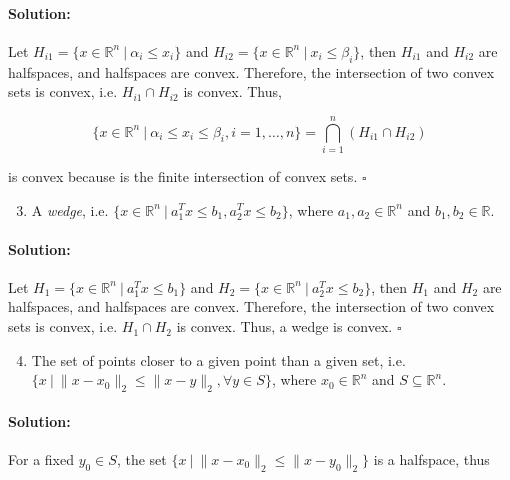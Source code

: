 \documentclass[10pt]{article}
\begin{document}
\paragraph{Solution:}

Let $H_{i1} = \{x \in \mathbb{R}^n \ | \ \alpha_i \leq x_i \}$ and $H_{i2} = \{x \in \mathbb{R}^n \ | \ x_i \leq \beta_i\}$, then $H_{i1}$ and $H_{i2}$ are halfspaces, and halfspaces are convex. Therefore, the intersection of two convex sets is convex, i.e. $H_{i1} \cap H_{i2}$ is convex. Thus, 

$$\{x \in \mathbb{R}^n \ | \ \alpha_i \leq x_i \leq \beta_i, i = 1, \dots, n\} = \bigcap_{i=1}^n \left(H_{i1} \cap H_{i2}\right)$$ 

is convex because is the finite intersection of convex sets. $\square$


\begin{enumerate}[label=(\alph*)]
  \setcounter{enumi}{2}
  \item A \textit{wedge}, i.e. $\{ x \in \mathbb{R}^n \ | \ a_1^Tx \leq b_1, a_2^Tx \leq b_2\}$, where $a_1, a_2 \in \mathbb{R}^n$ and $b_1, b_2 \in \mathbb{R}$.
\end{enumerate}

\paragraph{Solution:}

Let $H_1 = \{ x \in \mathbb{R}^n \ | \ a_1^Tx \leq b_1\}$ and $H_2 = \{ x \in \mathbb{R}^n \ | \ a_2^Tx \leq b_2\}$, then $H_1$ and $H_2$ are halfspaces, and halfspaces are convex. Therefore, the intersection of two convex sets is convex, i.e. $H_1 \cap H_2$ is convex. Thus, a wedge is convex. $\square$ 




\begin{enumerate}[label=(\alph*)]
  \setcounter{enumi}{3}
  \item The set of points closer to a given point than a given set, i.e. $\{x \ | \ \| x-x_0 \|_2 \leq \| x - y \|_2, \forall y \in S\}$, where $x_0 \in \mathbb{R}^n$ and $S \subseteq \mathbb{R}^n$.
\end{enumerate}

\paragraph{Solution:}

For a fixed $y_0 \in S$, the set $\{x \ | \ \| x-x_0 \|_2 \leq \| x - y_0 \|_2\}$ is a halfspace, thus 
\end{document}

